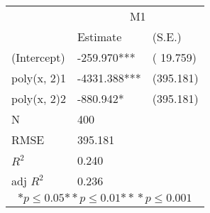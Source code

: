 \begin{tabular}{*{3}{l}}
\hline
                  & \multicolumn{2}{c}{M1}   \tabularnewline
                   &Estimate  &(S.E.)  \tabularnewline
 \hline
 \hline
   (Intercept)     &-259.970***   &   ( 19.759) \tabularnewline
   poly(x, 2)1     &-4331.388***   &   (395.181) \tabularnewline
   poly(x, 2)2     &-880.942*   &   (395.181) \tabularnewline
 \hline
 N                 &400       &        \tabularnewline
 RMSE             &395.181         & \tabularnewline
 $R^2$             &0.240         & \tabularnewline
 adj $R^2$         &0.236         & \tabularnewline
 \hline
\hline
 
 \multicolumn{3}{c}{${*  p}\le 0.05$${*\!\!*  p}\le 0.01$${*\!\!*\!\!*  p}\le 0.001$}\tabularnewline
 \end{tabular}